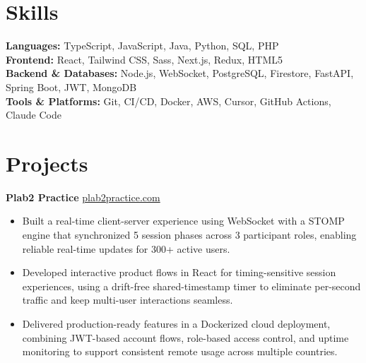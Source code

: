 \documentclass[11pt]{article}       %
\begin{document}
\vspace{-10.5pt}

\section*{Skills}
\textbf{Languages:} TypeScript, JavaScript, Java, Python, SQL, PHP \\
\textbf{Frontend:} React, Tailwind CSS, Sass, Next.js, Redux, HTML5 \\
\textbf{Backend \& Databases:} Node.js, WebSocket, PostgreSQL, Firestore, FastAPI, Spring Boot, JWT, MongoDB \\
\textbf{Tools \& Platforms:} Git, CI/CD, Docker, AWS, Cursor, GitHub Actions, Claude Code
\vspace{-5pt}






\section*{Projects}
\textbf{Plab2 Practice} \hfill \href{https://plab2practice.com}{plab2practice.com} \\
\vspace{-9pt}
\begin{itemize}
  \item Built a real-time client-server experience using WebSocket with a STOMP engine that synchronized 5 session phases across 3 participant roles, enabling reliable real-time updates for 300+ active users.
  \item Developed interactive product flows in React for timing-sensitive session experiences, using a drift-free shared-timestamp timer to eliminate per-second traffic and keep multi-user interactions seamless.
  \item Delivered production-ready features in a Dockerized cloud deployment, combining JWT-based account flows, role-based access control, and uptime monitoring to support consistent remote usage across multiple countries.
\end{itemize}
\end{document}
